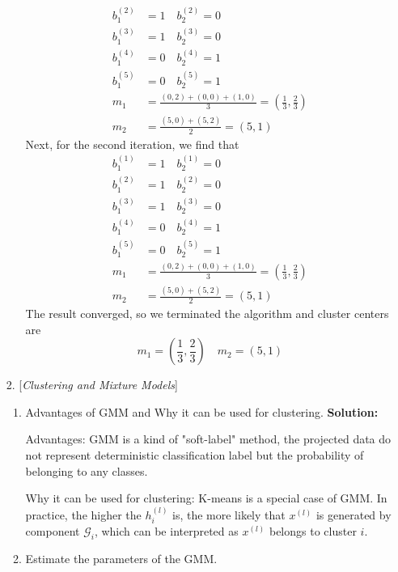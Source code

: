 \documentclass{article}
\begin{document}
\begin{enumerate}
\begin{enumerate}
\begin{align*}
                b_1^{(2)}&=1\quad b_2^{(2)}=0\\
                b_1^{(3)}&=1\quad b_2^{(3)}=0\\
                b_1^{(4)}&=0\quad b_2^{(4)}=1\\
                b_1^{(5)}&=0\quad b_2^{(5)}=1\\
                m_1&=\frac{(0,2)+(0,0)+(1,0)}{3}=(\frac{1}{3},\frac{2}{3})\\
                m_2 &= \frac{(5,0)+(5,2)}{2}=(5,1)
              \end{align*}
              Next, for the second iteration, we find that 
              \begin{align*}
                b_1^{(1)}&=1\quad b_2^{(1)}=0\\
                b_1^{(2)}&=1\quad b_2^{(2)}=0\\
                b_1^{(3)}&=1\quad b_2^{(3)}=0\\
                b_1^{(4)}&=0\quad b_2^{(4)}=1\\
                b_1^{(5)}&=0\quad b_2^{(5)}=1\\
                m_1&=\frac{(0,2)+(0,0)+(1,0)}{3}=(\frac{1}{3},\frac{2}{3})\\
                m_2 &= \frac{(5,0)+(5,2)}{2}=(5,1)
              \end{align*}
              The result converged, so we terminated the algorithm and cluster centers are 
              \[m_1=(\frac{1}{3},\frac{2}{3})\quad m_2 = (5,1)\]
	      \end{enumerate}
	\item [2.] [\textit{Clustering and Mixture Models}]
	      \begin{enumerate}
		      \setlength\parindent{2em}
		      \item Advantages of GMM and Why it can be used for clustering.\newline
		      {\bf Solution:}
              \par Advantages: GMM is a kind of "soft-label" method, the projected data do not represent deterministic classification label but the probability of belonging to any classes.
              \par Why it can be used for clustering: K-means is a special case of GMM. In practice, the higher the $h_i^{(l)}$ is, the more likely that $x^{(l)}$ is generated by component $\mathcal{G}_i$, which can be interpreted as $x^{(l)}$ belongs to cluster $i$.
		      \item Estimate the parameters of the GMM.\newline

\end{enumerate}
\end{enumerate}
\end{document}
